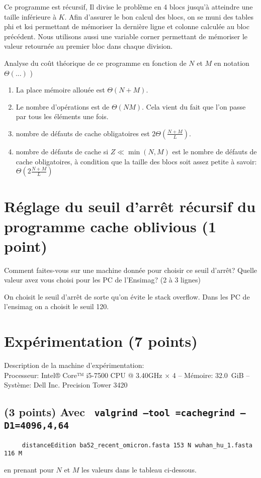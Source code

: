 \documentclass[10pt,a4paper]{article}
\begin{document}
Ce programme est récursif, Il divise le problème en 4 blocs jusqu'à atteindre une taille inférieure à $K$. Afin d'assurer le bon calcul des blocs, on se muni des tables phi et ksi permettant de mémoriser la dernière ligne et colonne calculée au bloc précédent. Nous utilisons aussi une variable corner permettant de mémoriser le valeur retournée au premier bloc dans chaque division.
\vspace*{1.0cm}

Analyse du coût théorique de ce  programme en fonction de $N$ et $M$  en notation $\Theta(...)$ )
\begin{enumerate}
  \item La place mémoire allouée est $\Theta(N + M)$.
  \item Le nombre d'opérations est de $\Theta(NM)$. Cela vient du fait que l'on passe par tous les éléments une fois. 
  \item nombre de défauts de cache obligatoires est $2\Theta(\frac{N + M}{L})$.
  \item nombre de défauts de cache si $Z \ll \min(N,M)$ est le nombre de défauts de cache obligatoires, à condition que la taille des blocs soit assez petite à savoir: $\Theta(2\frac{N + M}{L})$ 
  
\end{enumerate}

\section{Réglage du seuil d'arrêt récursif du programme cache oblivious  (1 point)} 
Comment faites-vous sur une machine donnée pour choisir ce seuil d'arrêt? Quelle valeur avez vous choisi pour les
PC de l'Ensimag? (2 à 3 lignes) 
\vspace*{1.0cm}

On choisit le seuil d'arrêt de sorte qu'on évite le stack overflow. Dans les PC de l'ensimag on a choisit le seuil 120. 
\section{Expérimentation (7 points)}

Description de la machine d'expérimentation:  \\
Processeur: Intel® Core™ i5-7500 CPU @ 3.40GHz × 4  --
Mémoire: 32.0 GiB --
Système: Dell Inc. Precision Tower 3420 

\subsection{(3 points) Avec {\tt 
	valgrind --tool =cachegrind --D1=4096,4,64
}} 
\begin{verbatim}
     distanceEdition ba52_recent_omicron.fasta 153 N wuhan_hu_1.fasta 116 M 
\end{verbatim}
en prenant pour $N$ et $M$ les valeurs dans le tableau ci-dessous.
\end{document}
